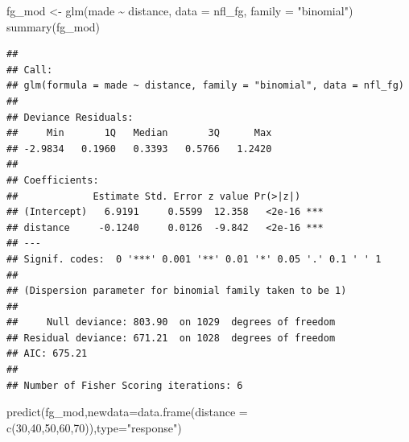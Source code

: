 \documentclass[
  11pt,
]{book}
\newenvironment{Shaded}{\begin{snugshade}}{\end{snugshade}}
\newcommand{\AttributeTok}[1]{\textcolor[rgb]{0.77,0.63,0.00}{#1}}
\newcommand{\ConstantTok}[1]{\textcolor[rgb]{0.00,0.00,0.00}{#1}}
\newcommand{\DecValTok}[1]{\textcolor[rgb]{0.00,0.00,0.81}{#1}}
\newcommand{\FunctionTok}[1]{\textcolor[rgb]{0.00,0.00,0.00}{#1}}
\newcommand{\NormalTok}[1]{#1}
\newcommand{\OtherTok}[1]{\textcolor[rgb]{0.56,0.35,0.01}{#1}}
\newcommand{\SpecialCharTok}[1]{\textcolor[rgb]{0.00,0.00,0.00}{#1}}
\newcommand{\StringTok}[1]{\textcolor[rgb]{0.31,0.60,0.02}{#1}}
\theoremstyle{definition}
\theoremstyle{definition}
\theoremstyle{definition}
\theoremstyle{definition}
\theoremstyle{remark}
\begin{document}
\begin{Shaded}
\end{Shaded}

\newpage

\begin{Shaded}
\begin{Highlighting}[]
\NormalTok{fg\_mod }\OtherTok{\textless{}{-}} \FunctionTok{glm}\NormalTok{(made }\SpecialCharTok{\textasciitilde{}}\NormalTok{ distance, }\AttributeTok{data =}\NormalTok{ nfl\_fg, }\AttributeTok{family =} \StringTok{"binomial"}\NormalTok{)}
\FunctionTok{summary}\NormalTok{(fg\_mod)}
\end{Highlighting}
\end{Shaded}

\begin{verbatim}
## 
## Call:
## glm(formula = made ~ distance, family = "binomial", data = nfl_fg)
## 
## Deviance Residuals: 
##     Min       1Q   Median       3Q      Max  
## -2.9834   0.1960   0.3393   0.5766   1.2420  
## 
## Coefficients:
##             Estimate Std. Error z value Pr(>|z|)    
## (Intercept)   6.9191     0.5599  12.358   <2e-16 ***
## distance     -0.1240     0.0126  -9.842   <2e-16 ***
## ---
## Signif. codes:  0 '***' 0.001 '**' 0.01 '*' 0.05 '.' 0.1 ' ' 1
## 
## (Dispersion parameter for binomial family taken to be 1)
## 
##     Null deviance: 803.90  on 1029  degrees of freedom
## Residual deviance: 671.21  on 1028  degrees of freedom
## AIC: 675.21
## 
## Number of Fisher Scoring iterations: 6
\end{verbatim}

\begin{Shaded}
\begin{Highlighting}[]
\FunctionTok{predict}\NormalTok{(fg\_mod,}\AttributeTok{newdata=}\FunctionTok{data.frame}\NormalTok{(}\AttributeTok{distance =} \FunctionTok{c}\NormalTok{(}\DecValTok{30}\NormalTok{,}\DecValTok{40}\NormalTok{,}\DecValTok{50}\NormalTok{,}\DecValTok{60}\NormalTok{,}\DecValTok{70}\NormalTok{)),}\AttributeTok{type=}\StringTok{"response"}\NormalTok{)}
\end{Highlighting}
\end{Shaded}
\end{document}
